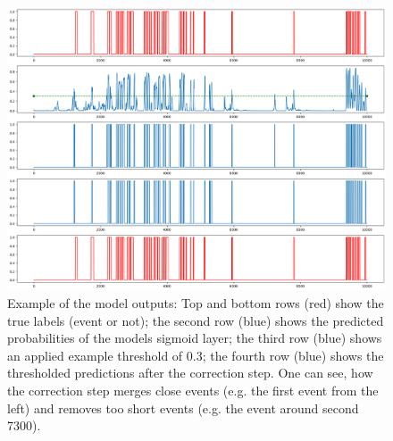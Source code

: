 \begin{figure}[h!]
    \centering
    \includegraphics[width=1.2\textwidth]{images/ModelOutput}
    \caption{Example of the model outputs: Top and bottom rows (red) show the true labels (event or not); the second row (blue) shows the predicted probabilities of the models sigmoid layer; the third row (blue) shows an applied example threshold of 0.3; the fourth row (blue) shows the thresholded predictions after the correction step. One can see, how the correction step merges close events (e.g. the first event from the left) and removes too short events (e.g. the event around second 7300).}
    \label{fig:example-output}
\end{figure}